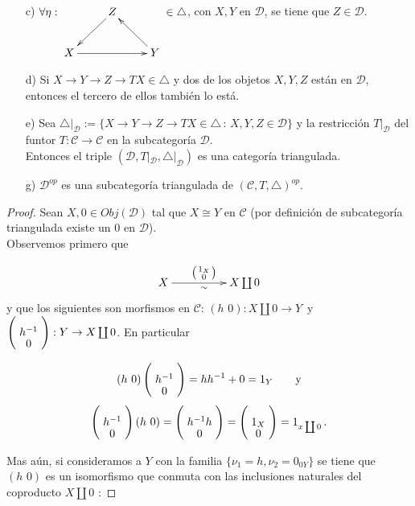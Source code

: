 \documentclass{article}
\newcommand{\spmat}[1]{%
  \left(\begin{smallmatrix}#1\end{smallmatrix}\right)%
}
\begin{document}
\begin{enumerate}
\begin{itemize}
\item[c)] $\forall \eta:\xymatrix{&Z\ar[ld]&\\ X\ar[rr] & &Y\ar[ul]}\in \triangle $, con $X,Y$ en $\mathscr{D}$, se tiene que $Z\in \mathscr{D}$.

\item[d)] Si $X\to Y\to Z\to TX \in \triangle$ y dos de los objetos $X,Y,Z$ están en $\mathscr{D}$, entonces el tercero de ellos también lo está.

\item[e)] Sea $\triangle|_\mathscr{D}:=\{X\to Y\to Z\to TX \in \triangle\,:\, X,Y,Z\in \mathscr{D}\}$ y la
restricción $T|_\mathscr{D}$ del funtor $T:\mathscr{C}\to\mathscr{C}$ en la subcategoría $\mathscr{D}$.\\
Entonces el triple $(\mathscr{D},T|_\mathscr{D},\triangle|_\mathscr{D})$ es una categoría triangulada.

\item[g)] $\mathscr{D}^{op}$ es una subcategoría triangulada de $(\mathscr{C},T,\triangle)^{op}$.
\end{itemize}

\begin{proof}
 Sean $X,0\in Obj(\mathscr{D})$ tal que $X\cong Y$ en $\mathscr{C}$ (por definición de subcategoría triangulada existe un $0$ en 
$\mathscr{D}$).\\

Observemos primero que

\begin{equation*}
\xymatrix@C+2pc{X\ar[r]_{\sim}^{\spmat{1_X \\ 0}}& X\coprod 0}\\
\end{equation*}
y que los siguientes son morfismos en $\mathscr{C}$:  $(h\,\,0): X\coprod 0\rightarrow Y$\,\,\,y\,\,\, 
$\left(\xymatrix@R=-1mm{h^{-1}\\0}\right):Y\rightarrow X\coprod 0$. En particular 

\[(h\,\,0) \left(\xymatrix@R=-1mm{h^{-1}\\0}\right)=hh^{-1} +0=1_Y\qquad \text{y}\]
\[\left(\xymatrix@R=-1mm{h^{-1}\\0}\right) (h\,\,0)=\left(\xymatrix@R=-1mm{h^{-1}h\\0}\right)
=\left(\xymatrix@R=-1mm{1_X\\0}\right)=1_{x\coprod 0}\,.\]

Mas aún, si consideramos a $Y$ con la familia $\{\nu_1=h, \nu_2=0_{0Y}\}$ se tiene que $(h\,\,0)$ es un isomorfismo que conmuta con las 
inclusiones naturales del coproducto $X\coprod 0$ :


\end{proof}
\end{enumerate}
\end{document}
